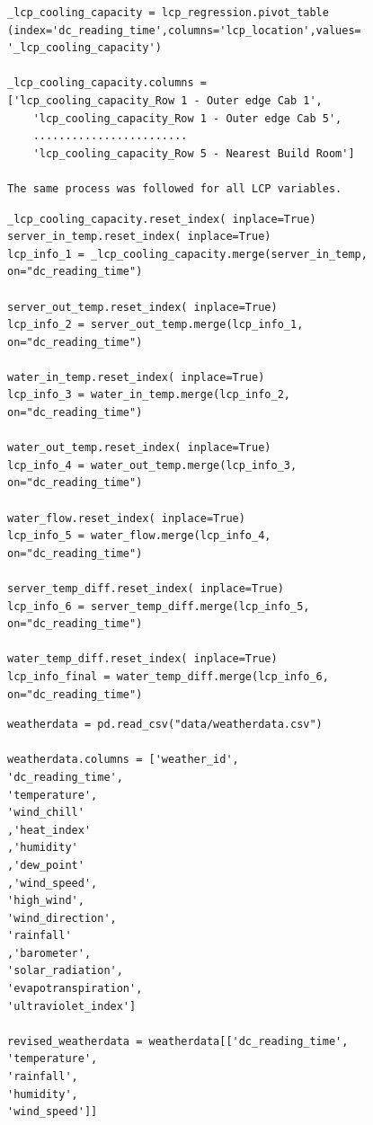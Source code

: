 \documentclass[12pt]{scrartcl}
\begin{document}
\begin{lstlisting}[frame=single,basicstyle=\footnotesize\ttfamily,
  caption={Python - Pivot Data around the LCP reading time},label={list:[Pivot Data around the LCP reading time]}]
_lcp_cooling_capacity = lcp_regression.pivot_table
(index='dc_reading_time',columns='lcp_location',values=
'_lcp_cooling_capacity')

_lcp_cooling_capacity.columns = 
['lcp_cooling_capacity_Row 1 - Outer edge Cab 1',
    'lcp_cooling_capacity_Row 1 - Outer edge Cab 5', 
    ........................
    'lcp_cooling_capacity_Row 5 - Nearest Build Room']
    
The same process was followed for all LCP variables.

\end{lstlisting}

\begin{lstlisting}[frame=single,basicstyle=\footnotesize\ttfamily,
  caption={Python - Merge LCP Pivot Tables together},label={list:[Merge LCP Pivot Tables together]}]
_lcp_cooling_capacity.reset_index( inplace=True)
server_in_temp.reset_index( inplace=True)
lcp_info_1 = _lcp_cooling_capacity.merge(server_in_temp, 
on="dc_reading_time")

server_out_temp.reset_index( inplace=True)
lcp_info_2 = server_out_temp.merge(lcp_info_1, 
on="dc_reading_time")

water_in_temp.reset_index( inplace=True)
lcp_info_3 = water_in_temp.merge(lcp_info_2, 
on="dc_reading_time")

water_out_temp.reset_index( inplace=True)
lcp_info_4 = water_out_temp.merge(lcp_info_3, 
on="dc_reading_time")

water_flow.reset_index( inplace=True)
lcp_info_5 = water_flow.merge(lcp_info_4, 
on="dc_reading_time")

server_temp_diff.reset_index( inplace=True)
lcp_info_6 = server_temp_diff.merge(lcp_info_5, 
on="dc_reading_time")

water_temp_diff.reset_index( inplace=True)
lcp_info_final = water_temp_diff.merge(lcp_info_6, 
on="dc_reading_time")

\end{lstlisting}

\begin{lstlisting}[frame=single,basicstyle=\footnotesize\ttfamily,
  caption={Python - Import and Merge Weather Data},label={list:[Import and Merge Weather Data]}]
weatherdata = pd.read_csv("data/weatherdata.csv")

weatherdata.columns = ['weather_id',
'dc_reading_time',
'temperature',
'wind_chill'
,'heat_index'
,'humidity'
,'dew_point'
,'wind_speed',
'high_wind',
'wind_direction',
'rainfall'
,'barometer',
'solar_radiation',
'evapotranspiration',
'ultraviolet_index']

revised_weatherdata = weatherdata[['dc_reading_time',
'temperature',
'rainfall',
'humidity',
'wind_speed']]


\end{lstlisting}
\end{document}
